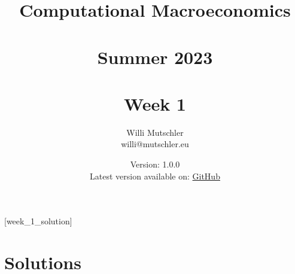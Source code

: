 
\newif\ifDisplaySolutions\DisplaySolutionstrue


\title{Computational Macroeconomics\\~\\Summer 2023\\~\\Week 1}
\author{Willi Mutschler\\willi@mutschler.eu}
\date{Version: 1.0.0\\Latest version available on: \href{https://github.com/wmutschl/Computational-Macroeconomics/releases/latest/download/week_1.pdf}{GitHub}}
\maketitle\thispagestyle{empty}

\newpage
{}[week_1_solution]
\tableofcontents\thispagestyle{empty}\newpage

\setcounter{page}{1}
\newpage
\newpage
\newpage
\newpage
\printbibliography
\newpage

\ifDisplaySolutions
\newpage
\appendix
\section{Solutions}

\fi

